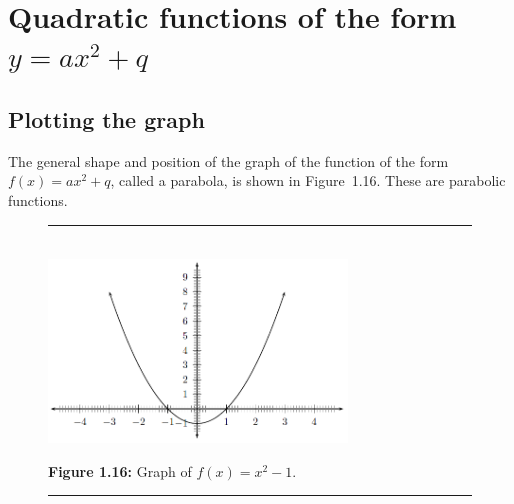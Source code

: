 % 
%     
%     
%     
\par 

\section{Quadratic functions of the form $y=a{x}^{2}+q$}
\nopagebreak

\subsection*{Plotting the graph}         
The general shape and position of the graph of the function of the form $f(x)=a{x}^{2}+q$, called a parabola, is shown in Figure~1.16. These are parabolic functions.\par 

\setcounter{subfigure}{0}
\begin{figure}[H] %
\begin{center}
\rule[.1in]{\figurerulewidth}{.005in} \\
\label{m39345*uid102!!!underscore!!!media}\label{m39345*uid102!!!underscore!!!printimage}\includegraphics[width=300px]{col11306.imgs/m39345_MG10C11_013.png} %
\vspace{2pt}
\vspace{\rubberspace}\par \begin{cnxcaption}
\small \textbf{Figure 1.16: }Graph of $f(x)={x}^{2}-1$.
\end{cnxcaption}
\vspace{.1in}
\rule[.1in]{\figurerulewidth}{.005in} \\
\end{center}
\end{figure}       

